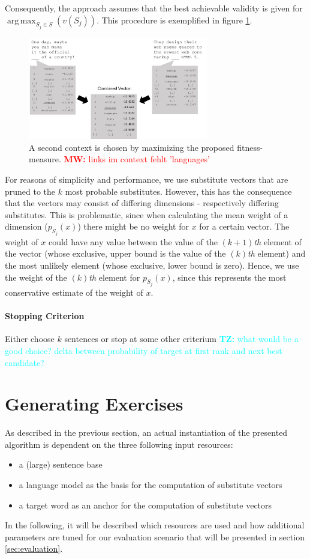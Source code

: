 \documentclass[11pt,letterpaper]{article}
\newcommand{\tz}[1]{\textcolor{cyan}{\textbf{TZ:} #1}}
\newcommand{\mw}[1]{\textcolor{red}{\textbf{MW:} #1}}
\newcommand{\tz}[1]{}
\newcommand{\mw}[1]{}
\DeclareMathOperator*{\argmax}{arg\,max}
\begin{document}
Consequently, the approach assumes that the best achievable validity is given for $\argmax_{S_j \in S}(v(S_j)) $. 
This procedure is exemplified in figure \ref{fig:secondStep}. 
\begin{figure}
	\centering
  		\includegraphics[width=0.7\textwidth]{figures/example_second_context.png}
  		\caption{A second context is chosen by maximizing the proposed fitness-measure. \mw{links im context fehlt 'languages'}}
  		\label{fig:secondStep}
\end{figure}
	
For reasons of simplicity and performance, we use substitute vectors that are pruned to the $k$ most probable substitutes. 
However, this has the consequence that the vectors may consist of differing dimensions - respectively differing substitutes. 
This is problematic, since when calculating the mean weight of a dimension ($p_{S_j}(x)$) there might be no weight for $x$ for a certain vector. 
The weight of $x$ could have any value between the value of the $(k+1)$\textit{th} element of the vector (whose exclusive, upper bound is the value of the $(k)$\textit{th} element) and the most unlikely element (whose exclusive, lower bound is zero).  
Hence, we use the weight of the $(k)$\textit{th} element for $p_{S_j}(x)$, since this represents the most conservative estimate of the weight of $x$.

\paragraph{Stopping Criterion}
Either choose $k$ sentences or stop at some other criterium
\tz{what would be a good choice? delta between probability of target at first rank and next best candidate?}


\section{Generating Exercises}	
As described in the previous section, an actual instantiation of the presented algorithm is dependent on the three following input resources:
	 \begin{itemize}
  		\item a (large) sentence base
  		\item a language model as the basis for the computation of substitute vectors
  		\item a target word as an anchor for the computation of substitute vectors
	\end{itemize}
In the following, it will be described which resources are used and how additional parameters are tuned for our evaluation scenario that will be presented in section \ref{sec:evaluation}.
\end{document}
